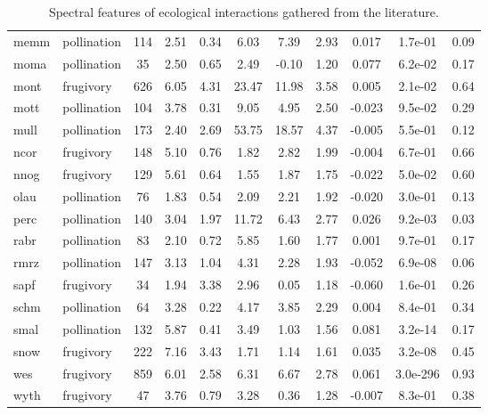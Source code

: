 \begin{table}[]
{\begin{tabular}{@{}llccccccccc@{}}
memm \cite{memm} & pollination & 114 & 2.51 & 0.34 & 6.03 & 7.39 & 2.93 & 0.017 & 1.7e-01 & 0.09 \\
moma \cite{moma} & pollination & 35 & 2.50 & 0.65 & 2.49 & -0.10 & 1.20 & 0.077 & 6.2e-02 & 0.17 \\
mont \cite{mont} & frugivory & 626 & 6.05 & 4.31 & 23.47 & 11.98 & 3.58 & 0.005 & 2.1e-02 & 0.64 \\
mott \cite{mott} & pollination & 104 & 3.78 & 0.31 & 9.05 & 4.95 & 2.50 & -0.023 & 9.5e-02 & 0.29 \\
mull \cite{mull} & pollination & 173 & 2.40 & 2.69 & 53.75 & 18.57 & 4.37 & -0.005 & 5.5e-01 & 0.12 \\
ncor \cite{ncor} & frugivory & 148 & 5.10 & 0.76 & 1.82 & 2.82 & 1.99 & -0.004 & 6.7e-01 & 0.66 \\
nnog \cite{nnog} & frugivory & 129 & 5.61 & 0.64 & 1.55 & 1.87 & 1.75 & -0.022 & 5.0e-02 & 0.60 \\
olau \cite{olau} & pollination & 76 & 1.83 & 0.54 & 2.09 & 2.21 & 1.92 & -0.020 & 3.0e-01 & 0.13 \\
perc \cite{perc} & pollination & 140 & 3.04 & 1.97 & 11.72 & 6.43 & 2.77 & 0.026 & 9.2e-03 & 0.03 \\
rabr \cite{rabr} & pollination & 83 & 2.10 & 0.72 & 5.85 & 1.60 & 1.77 & 0.001 & 9.7e-01 & 0.17 \\
rmrz \cite{rmrz} & pollination & 147 & 3.13 & 1.04 & 4.31 & 2.28 & 1.93 & -0.052 & 6.9e-08 & 0.06 \\
sapf \cite{sapf} & frugivory & 34 & 1.94 & 3.38 & 2.96 & 0.05 & 1.18 & -0.060 & 1.6e-01 & 0.26 \\
schm \cite{schm} & pollination & 64 & 3.28 & 0.22 & 4.17 & 3.85 & 2.29 & 0.004 & 8.4e-01 & 0.34 \\
smal \cite{smal} & pollination & 132 & 5.87 & 0.41 & 3.49 & 1.03 & 1.56 & 0.081 & 3.2e-14 & 0.17 \\
snow \cite{snow} & frugivory & 222 & 7.16 & 3.43 & 1.71 & 1.14 & 1.61 & 0.035 & 3.2e-08 & 0.45 \\
wes  \cite{wes}  & frugivory & 859 & 6.01 & 2.58 & 6.31 & 6.67 & 2.78 & 0.061 & 3.0e-296 & 0.93 \\
wyth \cite{wyth} & frugivory & 47 & 3.76 & 0.79 & 3.28 & 0.36 & 1.28 & -0.007 & 8.3e-01 & 0.38 \\ \bottomrule
\end{tabular}%
}
\caption{Spectral features of ecological interactions gathered from the literature.}
\label{FP_studies_table}
\end{table}
